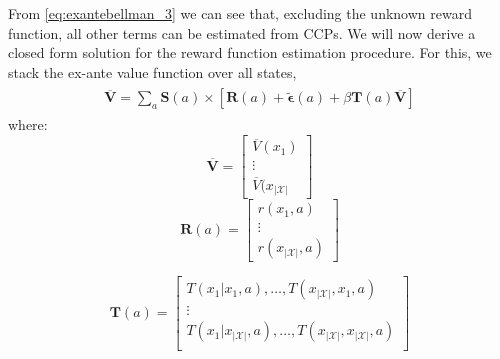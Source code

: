 \documentclass{article}
\begin{document}


From \eqref{eq:exantebellman_3} we can see that, excluding the unknown reward function, all other terms can be estimated from CCPs. We will now derive a closed form solution for the reward function estimation procedure. For this, we stack the ex-ante value function over all states,
\begin{align} \label{eq:exantebellman_4}
    \begin{split}
    \overline{\mathbf{V}}=\sum_{a}\mathbf{S}(a) \times \left[\mathbf{R}(a)+\tilde{\bm{\epsilon}}(a)+\beta \mathbf{T}(a) \overline{\mathbf{V}}\right]
    \end{split}
\end{align}
where:
\[
\overline{\mathbf{V}}=\left[\begin{array}{c}\overline{V}(x_1)\\\vdots\\\overline{V}(x_{|\mathcal{X}|}\end{array}\right]
\]
\[
\mathbf{R}(a)=\left[\begin{array}{c}r(x_1,a)\\\vdots\\ r(x_{|\mathcal{X}|},a)\end{array}\right]
\]

\[
\mathbf{T}(a)=\left[\begin{array}{ccc}
T(x_1|x_1,a),\dots,T(x_{|\mathcal{X}|},x_1,a)\\
\vdots\\
T(x_1|x_{|\mathcal{X}|},a),\dots,T(x_{|\mathcal{X}|},x_{|\mathcal{X}|},a)\\
\end{array}\right]
\]
\end{document}
